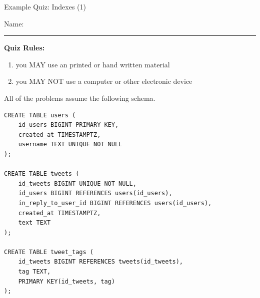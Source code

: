 \documentclass[12pt]{exam}
\theoremstyle{definition}
\begin{document}
\begin{center}
    {
\Large
    Example Quiz: Indexes (1)
}
\end{center}


\vspace{0.15in}

\vspace{0.25in}
\noindent
Name: 

\noindent
\rule{\textwidth}{0.1pt}
\vspace{0.15in}

\noindent
\textbf{Quiz Rules:} 

\noindent
\begin{enumerate}
\item you MAY use an printed or hand written material
\item you MAY NOT use a computer or other electronic device
\end{enumerate}
\newpage



\noindent
All of the problems assume the following schema.
\begin{lstlisting}
CREATE TABLE users (
    id_users BIGINT PRIMARY KEY,
    created_at TIMESTAMPTZ,
    username TEXT UNIQUE NOT NULL
);

CREATE TABLE tweets (
    id_tweets BIGINT UNIQUE NOT NULL,
    id_users BIGINT REFERENCES users(id_users),
    in_reply_to_user_id BIGINT REFERENCES users(id_users),
    created_at TIMESTAMPTZ,
    text TEXT
);

CREATE TABLE tweet_tags (
    id_tweets BIGINT REFERENCES tweets(id_tweets),
    tag TEXT,
    PRIMARY KEY(id_tweets, tag)
);
\end{lstlisting}
\end{document}
